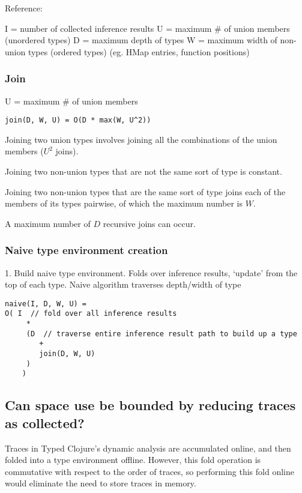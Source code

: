 \documentclass[10pt]{article}
\begin{document}
Reference:

I = number of collected inference results
U = maximum # of union members (unordered types)
D = maximum depth of types
W = maximum width of non-union types (ordered types) (eg. HMap entries, function positions)

\subsubsection*{Join}

U = maximum # of union members

\begin{verbatim}
join(D, W, U) = O(D * max(W, U^2))
\end{verbatim}

Joining two union types involves joining all the combinations of the union members ($U^2$ joins).

Joining two non-union types that are not the same sort of type is constant.

Joining two non-union types that are the same sort of type joins
each of the members of its types pairwise, of which the maximum number is $W$.

A maximum number of $D$ recursive joins can occur.

\subsubsection*{Naive type environment creation}

1. Build naive type environment.
	 Folds over inference results, `update' from the top of each type.
	 Naive algorithm traverses depth/width of type 

\begin{verbatim}
naive(I, D, W, U) = 
O( I  // fold over all inference results
	 * 
	 (D  // traverse entire inference result path to build up a type
		+
		join(D, W, U)
	 )
	)
\end{verbatim}


\subsection*{Can space use be bounded by reducing traces as collected?}

Traces in Typed Clojure's dynamic analysis are accumulated online, and then
folded into a type environment offline. However, this fold operation is commutative
with respect to the order of traces, so performing this fold online would
eliminate the need to store traces in memory.
\end{document}
